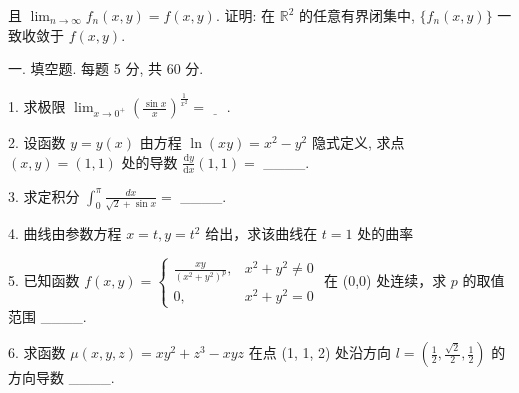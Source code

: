 \documentclass{examcollection}
\begin{document}
{\begin{minipage}{\textwidth}
且 $\lim_{n\to \infty}f_n(x,y) = f(x,y)$. 证明: 在 $\mathbb{R}^2$ 的任意有界闭集中, $\{f_n(x,y)\}$ 一致收敛于 $f(x,y)$.\par
{}\smallskip
一. 填空题. 每题 5 分, 共 60 分.\par
1. 求极限  $\lim_{x\to0^{+}}\left(\frac{\sin x}{x}\right)^{\frac{1}{x^{2}}}=\underline{\quad}$ .\par
2. 设函数 $y = y(x)$ 由方程 $\ln(xy) = x^2 - y^2$ 隐式定义, 求点 $(x, y) = (1, 1)$ 处的导数 $\frac{\mathrm{d}y}{\mathrm{d}x}(1, 1) =$ \_\_\_\_.\par
3. 求定积分  $\int_{0}^{\pi}\frac{dx}{\sqrt{2}+\sin x}=$  \_\_\_\_.\par
4. 曲线由参数方程 $x = t, y = t^2$ 给出，求该曲线在 $t = 1$ 处的曲率\par
5. 已知函数 $f(x, y) = \begin{cases} \frac{xy}{(x^2 + y^2)^p}, & x^2 + y^2 \neq 0 \\ 0, & x^2 + y^2 = 0 \end{cases}$ 在 (0,0) 处连续，求 $p$ 的取值范围 \_\_\_\_.\par
6. 求函数 $\mu(x, y, z) = xy^2 + z^3 - xyz$ 在点 (1, 1, 2) 处沿方向 $l = \left(\frac{1}{2}, \frac{\sqrt{2}}{2}, \frac{1}{2}\right)$ 的方向导数 \_\_\_\_.\par
\end{minipage}}
\ifdim\dimexpr\ht\proofbox+\dp\proofbox\relax>\textheight
\noindent\resizebox{!}{\textheight}{\usebox{\proofbox}}\else\noindent\usebox{\proofbox}\fi\clearpage
\end{document}
